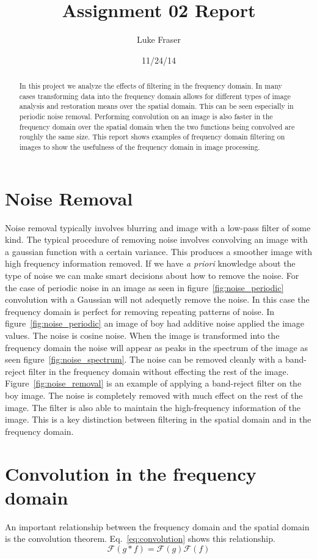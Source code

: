 \documentclass[letterpaper]{article}
\title{Assignment 02 Report}
\author{Luke Fraser}
\date{11/24/14}
\begin{document}
\maketitle
\begin{abstract}
In this project we analyze the effects of filtering in the frequency domain. In many cases transforming data into the frequency domain allows for different types of image analysis and restoration means over the spatial domain. This can be seen especially in periodic noise removal. Performing convolution on an image is also faster in the frequency domain over the spatial domain when the two functions being convolved are roughly the same size. This report shows examples of frequency domain filtering on images to show the usefulness of the frequency domain in image processing.
\end{abstract}

\section{Noise Removal}
Noise removal typically involves blurring and image with a low-pass filter of some kind. The typical procedure of removing noise involves convolving an image with a gaussian function with a certain variance. This produces a smoother image with high frequency information removed. If we have \emph{a priori} knowledge about the type of noise we can make smart decisions about how to remove the noise. For the case of periodic noise in an image as seen in figure~\ref{fig:noise_periodic} convolution with a Gaussian will not adequetly remove the noise. In this case the frequency domain is perfect for removing repeating patterns of noise. In figure~\ref{fig:noise_periodic} an image of boy had additive noise applied the image values. The noise is cosine noise. When the image is transformed into the frequency domain the noise will appear as peaks in the spectrum of the image as seen figure~\ref{fig:noise_spectrum}. The noise can be removed cleanly with a band-reject filter in the frequency domain without effecting the rest of the image. Figure~\ref{fig:noise_removal} is an example of applying a band-reject filter on the boy image. The noise is completely removed with much effect on the rest of the image. The filter is also able to maintain the high-frequency information of the image. This is a key distinction between filtering in the spatial domain and in the frequency domain.
\section{Convolution in the frequency domain}
An important relationship between the frequency domain and the spatial domain is the convolution theorem. Eq.~\ref{eq:convolution} shows this relationship.
\begin{equation}\label{eq:convolution}
\mathcal{F}(g*f)=\mathcal{F}(g)\mathcal{F}(f) 
\end{equation}
\end{document}
